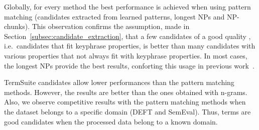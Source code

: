       Globally, for every method the best performance is achieved when using
      pattern matching (candidates extracted from learned patterns, longest NPs
      and NP-chunks). This observation confirms the assumption, made in
      Section~\ref{subsec:candidate_extraction}, that a few candidates of a good
      quality , i.e.~candidates that fit keyphrase properties, is better than
      many candidates with various properties that not always fit with keyphrase
      properties. In most cases, the longest NPs provide the best results,
      conforting this usage in previous
      work~\cite{wan2008expandrank,hassan2010conundrums,bougouin2013topicrank}.

      TermSuite candidates allow lower performances than the pattern matching
      methods. However, the results are better than the ones obtained with
      n-grams. Also, we observe competitive results with the pattern matching
      methods when the dataset belongs to a specific domain (DEFT and SemEval).
      Thus, terms are good candidates when the processed data belong to a known
      domain.

